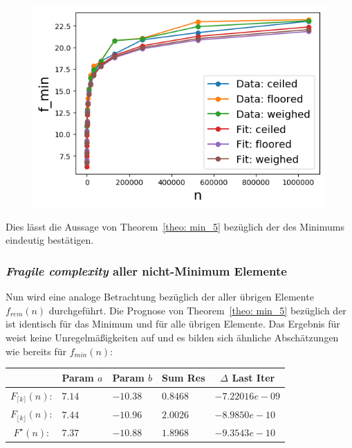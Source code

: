\begin{figure}[H]
\begin{minipage}[t]{.30\textwidth}
    \end{minipage}
    \hspace*{.4cm}
    \begin{minipage}[t]{.30\textwidth}
        \centering
        \includegraphics[width=1.11\textwidth]{pictures/min_theo5_min_all.png}
    \end{minipage}
    \vspace*{-0.1cm}
    \label{fig: min_theo5_fit_min}
\end{figure}

\noindent
Dies lässt die Aussage von Theorem~\ref{theo: min_5} bezüglich der \fg des Minimums \fgm eindeutig bestätigen.

\subsubsection*{\textit{Fragile complexity} aller nicht-Minimum Elemente}
Nun wird eine analoge Betrachtung bezüglich der \fg aller übrigen Elemente $f_{rem}(n)$ durchgeführt. Die Prognose von Theorem~\ref{theo: min_5} bezüglich der \fg ist identisch für das Minimum und für alle übrigen Elemente. Das Ergebnis für \fgr weist keine Unregelmäßigkeiten auf und es bilden sich ähnliche Abschätzungen wie bereits für $f_{min}(n)$:

\begin{center}
\begin{tabular}{c||l|l|l|l}

&\multicolumn{1}{c|}{Param $a$}&
\multicolumn{1}{c|}{Param $b$}&
\multicolumn{1}{c|}{Sum Res}&
\multicolumn{1}{c}{$\Delta$ Last Iter}\\
\hline
$F_{\lceil k \rceil}(n)$:&$7.14$&$-10.38$&$0.8468$&$-7.22016e-09$\\
\hline
$F_{\lfloor k \rfloor}(n)$:&$7.44$&$-10.96$&$2.0026$&$-8.9850e-10$\\
\hline
$F^{\star}(n)$:&$7.37$&$-10.88$&$1.8968$&$-9.3543e-10$
\end{tabular}
\end{center}

